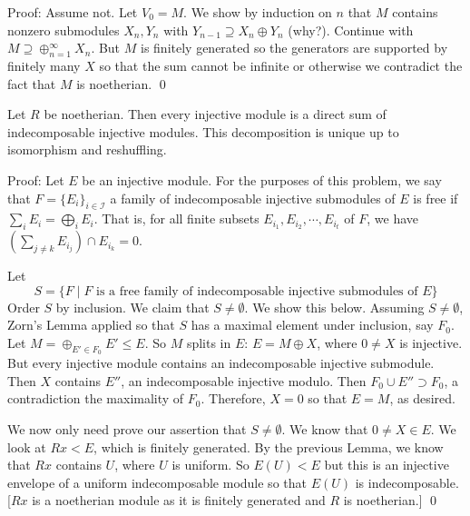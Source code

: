 Proof: Assume not. Let $V_0=M$. We show by induction on $n$ that $M$ contains nonzero submodules $X_n,Y_n$ with $Y_{n-1} \supseteq X_n \oplus Y_n$ (why?). Continue with $M \supseteq \oplus_{n=1}^\infty X_n$. But $M$ is finitely generated so the generators are supported by finitely many $X$ so that the sum cannot be infinite or otherwise we contradict the fact that $M$ is noetherian. \qed \\

\begin{thm}
Let $R$ be noetherian. Then every injective module is a direct sum of indecomposable injective modules. This decomposition is unique up to isomorphism and reshuffling. 
\end{thm}

Proof: Let $E$ be an injective module. For the purposes of this problem, we say that $F=\{E_i\}_{i \in \mathcal{I}}$ a family of indecomposable injective submodules of $E$ is free if $\sum_i E_i=\bigoplus_i E_i$. That is, for all finite subsets $E_{i_1},E_{i_2},\cdots,E_{i_t}$ of $F$, we have $\left(\sum_{j \neq k} E_{i_j} \right) \cap E_{i_k}=0$. 

Let 
\[
S=\{F\;|\; F \text{ is a free family of indecomposable injective submodules of }E\}
\]
Order $S$ by inclusion. We claim that $S \neq \emptyset$. We show this below. Assuming $S \neq \emptyset$, Zorn's Lemma applied so that $S$ has a maximal element under inclusion, say $F_0$. Let $M=\oplus_{E' \in F_0} E' \leq E$. So $M$ splits in $E$: $E= M \oplus X$, where $0 \neq X$ is injective. But every injective module contains an indecomposable injective submodule. Then $X$ contains $E''$, an indecomposable injective modulo. Then $F_0 \cup E'' \supset F_0$, a contradiction the maximality of $F_0$. Therefore, $X=0$ so that $E=M$, as desired. 

We now only need prove our assertion that $S \neq \emptyset$. We know that $0 \neq X \in E$. We look at $Rx < E$, which is finitely generated. By the previous Lemma, we know that $Rx$ contains $U$, where $U$ is uniform. So $E(U)<E$ but this is an injective envelope of a uniform indecomposable module so that $E(U)$ is indecomposable. [$Rx$ is a noetherian module as it is finitely generated and $R$ is noetherian.] \qed \\


















